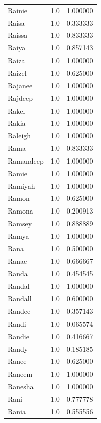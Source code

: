 \documentclass[
  letterpaper,
  DIV=11,
  numbers=noendperiod]{scrreprt}
\begin{document}
\begin{tabular}{lrr}
Rainie          &   1.0 &   1.000000 \\
Raisa           &   1.0 &   0.333333 \\
Raissa          &   1.0 &   0.833333 \\
Raiya           &   1.0 &   0.857143 \\
Raiza           &   1.0 &   1.000000 \\
Raizel          &   1.0 &   0.625000 \\
Rajanee         &   1.0 &   1.000000 \\
Rajdeep         &   1.0 &   1.000000 \\
Rakel           &   1.0 &   1.000000 \\
Rakia           &   1.0 &   1.000000 \\
Raleigh         &   1.0 &   1.000000 \\
Rama            &   1.0 &   0.833333 \\
Ramandeep       &   1.0 &   1.000000 \\
Ramie           &   1.0 &   1.000000 \\
Ramiyah         &   1.0 &   1.000000 \\
Ramon           &   1.0 &   0.625000 \\
Ramona          &   1.0 &   0.200913 \\
Ramsey          &   1.0 &   0.888889 \\
Ramya           &   1.0 &   1.000000 \\
Rana            &   1.0 &   0.500000 \\
Ranae           &   1.0 &   0.666667 \\
Randa           &   1.0 &   0.454545 \\
Randal          &   1.0 &   1.000000 \\
Randall         &   1.0 &   0.600000 \\
Randee          &   1.0 &   0.357143 \\
Randi           &   1.0 &   0.065574 \\
Randie          &   1.0 &   0.416667 \\
Randy           &   1.0 &   0.185185 \\
Ranee           &   1.0 &   0.625000 \\
Raneem          &   1.0 &   1.000000 \\
Ranesha         &   1.0 &   1.000000 \\
Rani            &   1.0 &   0.777778 \\
Rania           &   1.0 &   0.555556 \\

\end{tabular}
\end{document}
